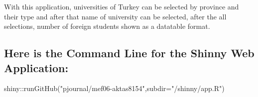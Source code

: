 \documentclass[
  letterpaper,
  DIV=11,
  numbers=noendperiod]{scrreprt}
\newenvironment{Shaded}{\begin{snugshade}}{\end{snugshade}}
\newcommand{\AttributeTok}[1]{\textcolor[rgb]{0.40,0.45,0.13}{#1}}
\newcommand{\FunctionTok}[1]{\textcolor[rgb]{0.28,0.35,0.67}{#1}}
\newcommand{\NormalTok}[1]{\textcolor[rgb]{0.00,0.23,0.31}{#1}}
\newcommand{\SpecialCharTok}[1]{\textcolor[rgb]{0.37,0.37,0.37}{#1}}
\newcommand{\StringTok}[1]{\textcolor[rgb]{0.13,0.47,0.30}{#1}}
\begin{document}
With this application, universities of Turkey can be selected by
province and their type and after that name of university can be
selected, after the all selections, number of foreign students shown as
a datatable format.

\hypertarget{here-is-the-command-line-for-the-shinny-web-application}{%
\subsection{Here is the Command Line for the Shinny Web
Application:}\label{here-is-the-command-line-for-the-shinny-web-application}}

\begin{Shaded}
\begin{Highlighting}[]
\NormalTok{shiny}\SpecialCharTok{::}\FunctionTok{runGitHub}\NormalTok{(}\StringTok{"pjournal/mef06{-}aktas8154"}\NormalTok{,}\AttributeTok{subdir=}\StringTok{"/shinny/app.R"}\NormalTok{)}
\end{Highlighting}
\end{Shaded}
\end{document}
